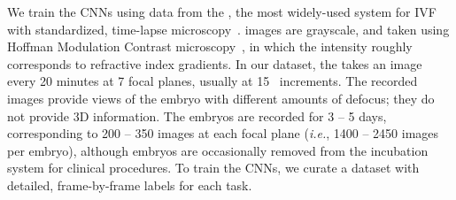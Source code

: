 We train the CNNs using data from the \Embryoscope{}, the most widely-used system for IVF with standardized, time-lapse microscopy~\cite{dolinko2017national}. \Embryoscope{} images are grayscale, and taken using Hoffman Modulation Contrast microscopy~\cite{hoffman1975modulation}, in which the intensity roughly corresponds to refractive index gradients. In our dataset, the \Embryoscope{} takes an image every 20 minutes at 7 focal planes, usually at 15~\micron{} increments. The recorded images provide views of the embryo with different amounts of defocus; they do not provide 3D information. The embryos are recorded for 3 -- 5 days, corresponding to 200 -- 350 images at each focal plane (\textit{i.e.}, 1400 -- 2450 images per embryo), although embryos are occasionally removed from the incubation system for clinical procedures. To train the CNNs, we curate a dataset with detailed, frame-by-frame labels for each task.

